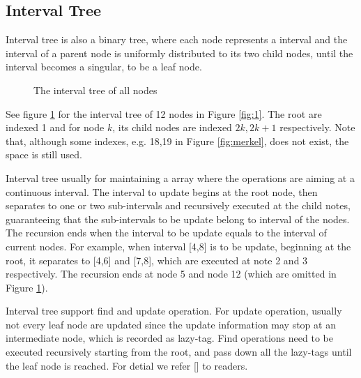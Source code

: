 \subsection{Interval Tree}
Interval tree is also a binary tree, where each node represents a interval and the interval of a parent node is uniformly distributed to its two child nodes, until the interval becomes a singular, to be a leaf node. 
\begin{figure}
	\centering
	\label{fig:interval}
	
	\caption{The interval tree of all nodes}
\end{figure}
See figure \ref{fig:interval} for the interval tree of 12 nodes in Figure \ref{fig:1}. The root are indexed 1 and for node $k$, its child nodes are indexed $2k,2k+1$ respectively. Note that, although some indexes, e.g. 18,19 in Figure \ref{fig:merkel}, does not exist, the space is still used. 

Interval tree usually for maintaining a array where the operations are aiming at a continuous interval. The interval to update begins at the root node, then separates to one or two sub-intervals and recursively executed at the child notes, guaranteeing that the sub-intervals to be update belong to interval of the nodes. The recursion ends when the interval to be update equals to the interval of current nodes. For example, when interval 
[4,8] is to be update, beginning at the root, it separates to [4,6] and [7,8], which are executed at note 2 and 3 respectively. The recursion ends at node 5 and node 12 (which are omitted in Figure \ref{fig:interval}).

Interval tree support find and update operation. For update operation, usually not every leaf node are updated since the update information may stop at an intermediate node, which is recorded as lazy-tag. Find operations need to be  executed recursively starting from the root, and pass down all the lazy-tags until the leaf node is reached. For detial we refer [] to readers.
